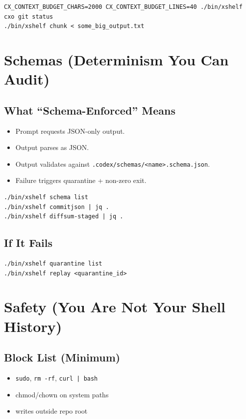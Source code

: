 \documentclass[11pt]{article}
\begin{document}
\begin{lstlisting}[style=cx]
CX_CONTEXT_BUDGET_CHARS=2000 CX_CONTEXT_BUDGET_LINES=40 ./bin/xshelf cxo git status
./bin/xshelf chunk < some_big_output.txt
\end{lstlisting}

\section{Schemas (Determinism You Can Audit)}
\subsection*{What ``Schema-Enforced'' Means}
\begin{itemize}
  \item Prompt requests JSON-only output.
  \item Output parses as JSON.
  \item Output validates against \texttt{.codex/schemas/<name>.schema.json}.
  \item Failure triggers quarantine + non-zero exit.
\end{itemize}

\begin{lstlisting}[style=cx]
./bin/xshelf schema list
./bin/xshelf commitjson | jq .
./bin/xshelf diffsum-staged | jq .
\end{lstlisting}

\subsection*{If It Fails}
\begin{lstlisting}[style=cx]
./bin/xshelf quarantine list
./bin/xshelf replay <quarantine_id>
\end{lstlisting}

\section{Safety (You Are Not Your Shell History)}
\subsection*{Block List (Minimum)}
\begin{itemize}
  \item \texttt{sudo}, \texttt{rm -rf}, \texttt{curl | bash}
  \item chmod/chown on system paths
  \item writes outside repo root
\end{itemize}
\end{document}
